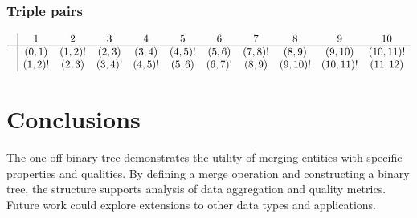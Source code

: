 \documentclass{article}
\theoremstyle{plain}
\begin{document}
\subsubsection{Triple pairs}


\[
\begin{array}{c|cccccccccccc}
  & 1 & 2 & 3 & 4 & 5& 6 & 7 & 8 & 9 & 10\\
\hline
& (0, 1) & (1, 2)! & (2, 3) & (3, 4)  & (4, 5)! & (5, 6) & (7, 8)! & (8, 9) & (9, 10)  & (10, 11)! \\
 & (1, 2)! & (2, 3) & (3, 4)! & (4, 5)!  & (5, 6) & (6, 7)! & (8, 9) & (9, 10)! & (10, 11)!  & (11, 12)
\end{array}
\]

\section*{Conclusions}

The one-off binary tree demonstrates the utility of merging entities with specific properties and qualities. By defining a merge operation and constructing a binary tree, the structure supports analysis of data aggregation and quality metrics. Future work could explore extensions to other data types and applications.
\end{document}
